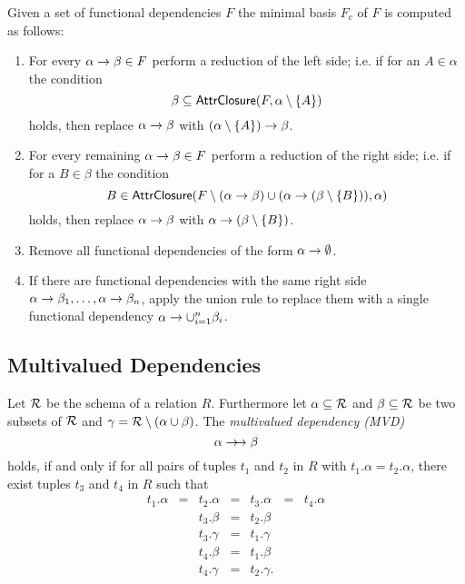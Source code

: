 Given a set of functional dependencies $F$ the minimal basis $F_c$ of $F$ is computed as follows:
\begin{enumerate}
\item
	For every $\alpha \rightarrow \beta \in F$ perform a reduction of the left side; i.e. if for an $A \in \alpha$ the condition
	\[ \beta \subseteq \mathsf{AttrClosure}(F,\alpha \setminus \{A\}) \]
	holds, then replace $\alpha \rightarrow \beta$ with $(\alpha\setminus\{A\})\rightarrow\beta$.
\item
	For every remaining $\alpha \rightarrow \beta \in F$ perform a reduction of the right side; i.e. if for a $B \in \beta$ the condition
	\[ B \in \mathsf{AttrClosure}(F\setminus(\alpha\rightarrow\beta)\cup(\alpha\rightarrow(\beta\setminus\{B\})),\alpha) \]
	holds, then replace $\alpha \rightarrow \beta$ with $\alpha \rightarrow (\beta\setminus\{B\})$.
\item Remove all functional dependencies of the form $\alpha \rightarrow \emptyset$.
\item If there are functional dependencies with the same right side $\alpha \rightarrow \beta_1, \ldots, \alpha \rightarrow \beta_n$, apply the union rule to replace them with a single functional dependency \mbox{$\alpha \rightarrow \cup_{i=1}^n \beta _i$}.
\end{enumerate}




\subsection{Multivalued Dependencies}

Let $\mathcal{R}$ be the schema of a relation $R$. Furthermore let $\alpha \subseteq \mathcal{R}$ and $\beta \subseteq \mathcal{R}$ be two subsets of $\mathcal{R}$ and $\gamma = \mathcal{R} \setminus (\alpha \cup \beta)$. The \emph{multivalued dependency (MVD)}
\[ \alpha \rightarrow\!\!\rightarrow \beta \]
holds, if and only if for all pairs of tuples $t_1$ and $t_2$ in $R$ with $t_1.\alpha = t_2.\alpha$, there exist tuples $t_3$ and $t_4$ in $R$ such that
\[ \begin{array}{rcrclcl}
t_1.\alpha & = & t_2.\alpha & = & t_3.\alpha & = & t_4.\alpha \\
& & t_3.\beta  & = & t_2.\beta  & & \\
& & t_3.\gamma & = & t_1.\gamma & & \\
& & t_4.\beta  & = & t_1.\beta  & & \\
& & t_4.\gamma & = & t_2.\gamma. & & \\
\end{array} \]

